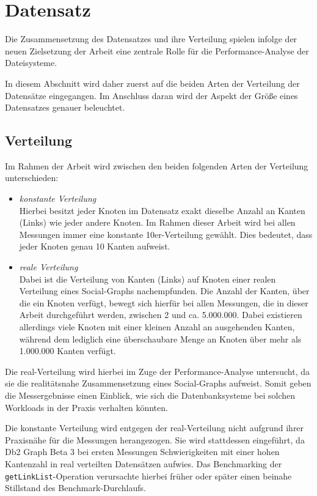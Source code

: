 \section{Datensatz}
\label{analyse:datensatz}
Die Zusammensetzung des Datensatzes und ihre Verteilung spielen infolge der neuen Zielsetzung der Arbeit eine zentrale Rolle für die Performance-Analyse der Dateisysteme.

In diesem Abschnitt wird daher zuerst auf die beiden Arten der Verteilung der Datensätze eingegangen. Im Anschluss daran wird der Aspekt der Größe eines Datensatzes genauer beleuchtet.

\subsection{Verteilung}
Im Rahmen der Arbeit wird zwischen den beiden folgenden Arten der Verteilung unterschieden:
\begin{itemize}
    \item \textit{konstante Verteilung}\\
    Hierbei besitzt jeder Knoten im Datensatz exakt dieselbe Anzahl an Kanten (Links) wie jeder andere Knoten. Im Rahmen dieser Arbeit wird bei allen Messungen immer eine konstante 10er-Verteilung gewählt. Dies bedeutet, dass jeder Knoten genau 10 Kanten aufweist. 
    \item \textit{reale Verteilung}\\
    Dabei ist die Verteilung von Kanten (Links) auf Knoten einer realen Verteilung eines Social-Graphs nachempfunden. Die Anzahl der Kanten, über die ein Knoten verfügt, bewegt sich hierfür bei allen Messungen, die in dieser Arbeit durchgeführt werden, zwischen 2 und ca. 5.000.000. Dabei existieren allerdings viele Knoten mit einer kleinen Anzahl an ausgehenden Kanten, während dem lediglich eine überschaubare Menge an Knoten über mehr als 1.000.000 Kanten verfügt.
\end{itemize}
Die real-Verteilung wird hierbei im Zuge der Performance-Analyse untersucht, da sie die realitätsnahe Zusammensetzung eines Social-Graphs aufweist. Somit geben die Messergebnisse einen Einblick, wie sich die Datenbanksysteme bei solchen Workloads in der Praxis verhalten könnten.

Die konstante Verteilung wird entgegen der real-Verteilung nicht aufgrund ihrer Praxisnähe für die Messungen herangezogen. Sie wird stattdessen eingeführt, da Db2 Graph Beta 3 bei ersten Messungen Schwierigkeiten mit einer hohen Kantenzahl in real verteilten Datensätzen aufwies. Das Benchmarking der \texttt{getLinkList}-Operation verursachte hierbei früher oder später einen beinahe Stillstand des Benchmark-Durchlaufs. 

